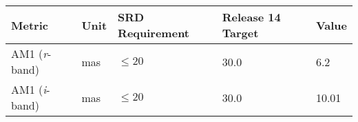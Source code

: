 \documentclass[DM,toc]{lsstdoc}
\begin{document}
\begin{longtable}[]{@{}lllll@{}}
\toprule
\begin{minipage}[b]{0.19\columnwidth}\raggedright\strut
Metric\strut
\end{minipage} & \begin{minipage}[b]{0.08\columnwidth}\raggedright\strut
Unit\strut
\end{minipage} & \begin{minipage}[b]{0.20\columnwidth}\raggedright\strut
SRD Requirement\strut
\end{minipage} & \begin{minipage}[b]{0.22\columnwidth}\raggedright\strut
Release 14 Target\strut
\end{minipage} & \begin{minipage}[b]{0.17\columnwidth}\raggedright\strut
Value\strut
\end{minipage}\tabularnewline
\midrule
\endhead
\begin{minipage}[t]{0.19\columnwidth}\raggedright\strut
AM1 (\emph{r}-band)\strut
\end{minipage} & \begin{minipage}[t]{0.08\columnwidth}\raggedright\strut
mas\strut
\end{minipage} & \begin{minipage}[t]{0.20\columnwidth}\raggedright\strut
\(\leq 20\)\strut
\end{minipage} & \begin{minipage}[t]{0.22\columnwidth}\raggedright\strut
30.0\strut
\end{minipage} & \begin{minipage}[t]{0.17\columnwidth}\raggedright\strut
6.2\strut
\end{minipage}\tabularnewline
\begin{minipage}[t]{0.19\columnwidth}\raggedright\strut
AM1 (\emph{i}-band)\strut
\end{minipage} & \begin{minipage}[t]{0.08\columnwidth}\raggedright\strut
mas\strut
\end{minipage} & \begin{minipage}[t]{0.20\columnwidth}\raggedright\strut
\(\leq 20\)\strut
\end{minipage} & \begin{minipage}[t]{0.22\columnwidth}\raggedright\strut
30.0\strut
\end{minipage} & \begin{minipage}[t]{0.17\columnwidth}\raggedright\strut
10.01\strut
\end{minipage}\tabularnewline

\end{longtable}
\end{document}
